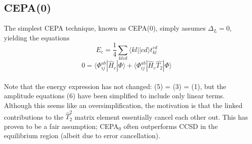 \documentclass{article}[11pt]
\begin{document}
\subsection*{CEPA(0)}
The simplest CEPA technique, known as CEPA(0), simply assumes $\Delta_{{L}} = 0$, yielding the equations
\begin{equation}
    E_c
= 
    \frac{1}{4}
   \sum\limits_{klcd}
   \langle kl || cd \rangle
   t_{kl}^{cd}
\end{equation}
\begin{equation}
    0 
= 
   \langle \Phi_{ij}^{ab} | 
      \hat{H}_c 
   | \Phi \rangle
+
   \langle \Phi_{ij}^{ab} |
      \hat{H}_c
      \hat{T_2}
   | \Phi \rangle
\end{equation}
\\
Note that the energy expression has not changed: (5) = (3) = (1), but the amplitude equations (6) have been simplified to include only linear terms. Although this seems like an oversimplification, the motivation is that the linked contributions to the $\hat{T}_2^2$ matrix element essentially cancel each other out. This has proven to be a fair assumption; CEPA$_0$ often outperforms CCSD in the equilibrium region (albeit due to error cancellation).
\end{document}
